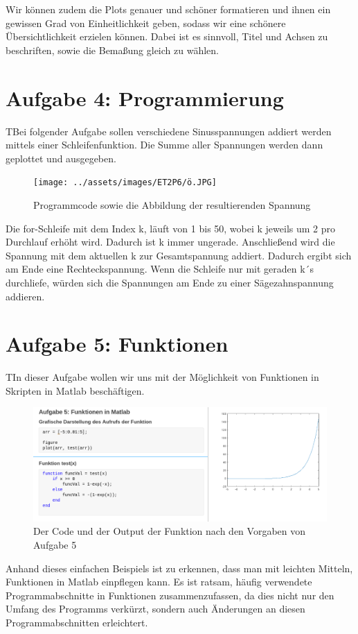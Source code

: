 \documentclass{article}
\begin{document}
Wir können zudem die Plots genauer und schöner formatieren und ihnen ein gewissen Grad von Einheitlichkeit geben, sodass wir eine schönere Übersichtlichkeit erzielen können. Dabei ist es sinnvoll, Titel und Achsen zu beschriften, sowie die Bemaßung gleich zu wählen.\\

\newpage
\newpage


\section{Aufgabe 4: Programmierung}
\begin{task}
  TBei folgender Aufgabe sollen verschiedene Sinusspannungen addiert werden mittels einer Schleifenfunktion. Die Summe aller Spannungen werden dann geplottet und ausgegeben.
\end{task}


\begin{figure}[h]
  \centering
  \texttt{[image: ../assets/images/ET2P6/ö.JPG]}
  \caption{Programmcode sowie die Abbildung der resultierenden Spannung}
\end{figure}

Die for-Schleife mit dem Index k, läuft von 1 bis 50, wobei k jeweils um 2 pro Durchlauf erhöht wird.
Dadurch ist k immer ungerade. Anschließend wird die Spannung mit dem aktuellen k zur Gesamtspannung addiert.
Dadurch ergibt sich am Ende eine Rechteckspannung.
Wenn die Schleife nur mit geraden k´s durchliefe, würden sich die Spannungen am Ende zu einer Sägezahnspannung addieren.

\newpage
\section{Aufgabe 5: Funktionen}

\begin{task}
  TIn dieser Aufgabe wollen wir uns mit der Möglichkeit von Funktionen in Skripten in Matlab beschäftigen.
\end{task}

\begin{figure}[h]
  \centering
  \includegraphics[width=\textwidth]{../assets/images/ET2P6/aufgabe5.png}
  \caption{Der Code und der Output der Funktion nach den Vorgaben von Aufgabe 5}
  \label{fig:auf5}
\end{figure}

Anhand dieses einfachen Beispiels ist zu erkennen, dass man mit leichten Mitteln, Funktionen in Matlab einpflegen kann. Es ist ratsam, häufig verwendete Programmabschnitte in Funktionen zusammenzufassen, da dies nicht nur den Umfang des Programms verkürzt, sondern auch Änderungen an diesen Programmabschnitten erleichtert.
\end{document}
